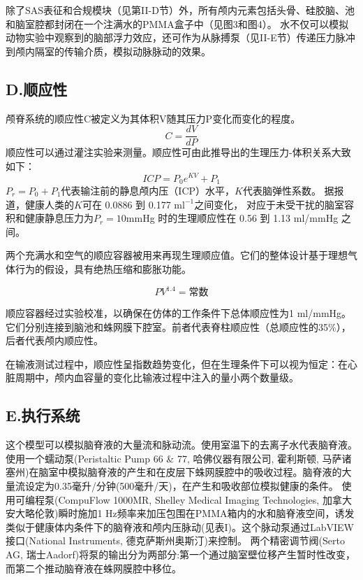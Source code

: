 \documentclass[12pt]{article}
\begin{document}
除了SAS表征和合规模块（见第II-D节）外，所有颅内元素包括头骨、硅胶脑、池和脑室腔都封闭在一个注满水的PMMA盒子中（见图3和图4）。
水不仅可以模拟动物实验中观察到的脑部浮力效应，还可作为从脉搏泵（见II-E节）传递压力脉冲到颅内隔室的传输介质，模拟动脉脉动的效果。

\subsection*{D.顺应性}
颅脊系统的顺应性C被定义为其体积V随其压力P变化而变化的程度。
\begin{equation}
    C = \frac{dV}{dP}
\end{equation}
顺应性可以通过灌注实验来测量。顺应性可由此推导出的生理压力-体积关系大致如下：
\begin{equation}
    ICP = P_0e^{KV} + P_1
\end{equation}
$P_r = P_0 + P_1$代表输注前的静息颅内压（ICP）水平，$K$代表脑弹性系数。
据报道，健康人类的$K$可在 0.0886 到 0.177 $\mathrm{ml}^{-1}$之间变化，
对应于未受干扰的脑室容积和健康静息压力为$P_r = 10$mmHg 时的生理顺应性在 0.56 到 1.13 ml/mmHg 之间。

两个充满水和空气的顺应容器被用来再现生理顺应值。它们的整体设计基于理想气体行为的假设，具有绝热压缩和膨胀功能。

\begin{equation}
    PV^{1.4} = \text{常数}
\end{equation}

顺应容器经过实验校准，以确保在仿体的工作条件下总体顺应性为1 ml/mmHg。
它们分别连接到脑池和蛛网膜下腔室。前者代表脊柱顺应性（总顺应性的35\%），后者代表颅内顺应性。

在输液测试过程中，顺应性呈指数趋势变化，但在生理条件下可以视为恒定：在心脏周期中，颅内血容量的变化比输液过程中注入的量小两个数量级。

\subsection*{E.执行系统}
这个模型可以模拟脑脊液的大量流和脉动流。使用室温下的去离子水代表脑脊液。
使用一个蠕动泵(Peristaltic Pump 66 \& 77, 哈佛仪器有限公司, 霍利斯顿, 马萨诸塞州)在脑室中模拟脑脊液的产生和在皮层下蛛网膜腔中的吸收过程。脑脊液的大量流设定为0.35毫升/分钟(500毫升/天)，在产生和吸收部位模拟健康的条件。
使用可编程泵(CompuFlow 1000MR, Shelley Medical Imaging Technologies, 加拿大安大略伦敦)瞬时施加1 Hz频率来加压包围在PMMA箱内的水和脑脊液空间，诱发类似于健康体内条件下的脑脊液和颅内压脉动(见表I)。这个脉动泵通过LabVIEW接口(National Instruments, 德克萨斯州奥斯汀)来控制。
两个精密调节阀(Serto AG, 瑞士Aadorf)将泵的输出分为两部分:第一个通过脑室壁位移产生暂时性改变，而第二个推动脑脊液在蛛网膜腔中移位。
\end{document}
